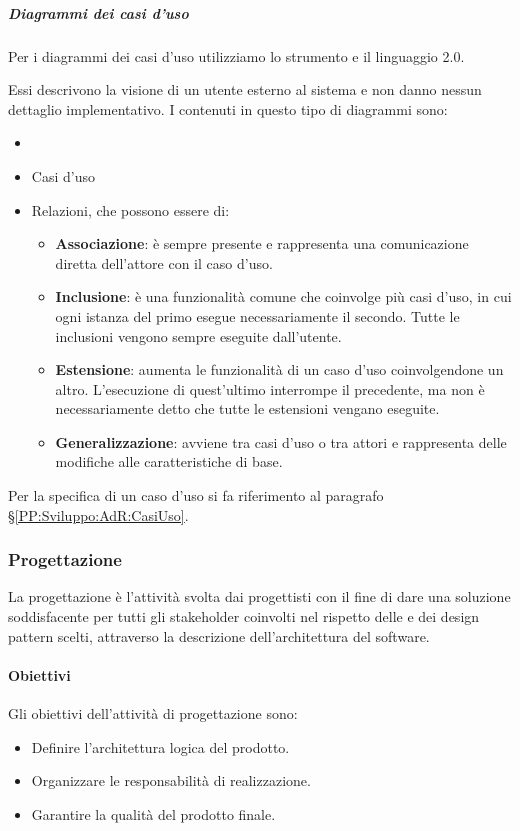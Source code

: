 		\subparagraph{Diagrammi dei casi d'uso}\label{PP:Sviluppo:DiagrammiCasiUso}
		Per i diagrammi dei casi d'uso utilizziamo lo strumento  e il linguaggio  2.0.\par
		Essi descrivono la visione di un utente
		esterno al sistema e non danno nessun dettaglio implementativo. I  contenuti in questo tipo di diagrammi sono:
		\begin{itemize}
			\item {}
			\item Casi d'uso
			\item Relazioni, che possono essere di:
			\begin{itemize}
				\item \textbf{Associazione}: è sempre presente e rappresenta una comunicazione diretta dell'attore con il caso d'uso.
				\item \textbf{Inclusione}: è una funzionalità comune che coinvolge più casi d'uso, in cui ogni istanza del primo esegue
					necessariamente il secondo. Tutte le inclusioni vengono sempre eseguite dall'utente.
				\item \textbf{Estensione}: aumenta le funzionalità di un caso d'uso coinvolgendone un altro. L'esecuzione di quest'ultimo interrompe il precedente, ma non è necessariamente detto che tutte le estensioni vengano eseguite.
				\item \textbf{Generalizzazione}: avviene tra casi d'uso o tra attori e rappresenta delle modifiche alle caratteristiche di base.
			\end{itemize}
		\end{itemize}
		Per la specifica di un caso d'uso si fa riferimento al paragrafo \S\ref{PP:Sviluppo:AdR:CasiUso}.

        \subsubsection{Progettazione}\label{PP:Sviluppo:Progettazione}
        La progettazione è l'attività svolta dai progettisti con il fine di dare una soluzione soddisfacente per tutti gli stakeholder coinvolti nel rispetto delle  e dei design pattern scelti, attraverso la descrizione dell'architettura del software.

		\paragraph{Obiettivi}\label{PP:Sviluppo:Progettazione:Obiettivi}
        Gli obiettivi dell'attività di progettazione sono:
        \begin{itemize}
			\item Definire l'architettura logica del prodotto.
			\item Organizzare le responsabilità di realizzazione.
			\item Garantire la qualità del prodotto finale.
		\end{itemize}

